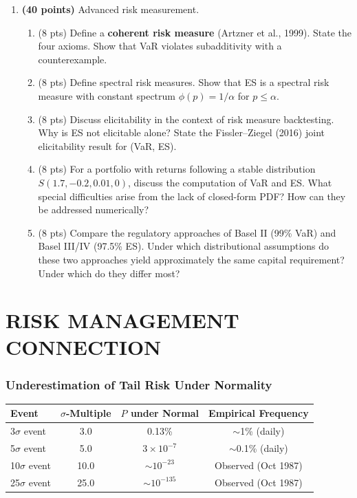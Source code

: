 \documentclass[11pt, a4paper]{article}
\theoremstyle{definition}
\begin{document}
\begin{enumerate}[label=\textbf{PhD-Q\arabic*.}]
\item \textbf{(40 points)} Advanced risk measurement.

\begin{enumerate}[label=(\alph*)]
  \item (8 pts) Define a \textbf{coherent risk measure} (Artzner et al., 1999). State the four axioms. Show that VaR violates subadditivity with a counterexample.
  \item (8 pts) Define spectral risk measures. Show that ES is a spectral risk measure with constant spectrum $\phi(p) = 1/\alpha$ for $p \leq \alpha$.
  \item (8 pts) Discuss elicitability in the context of risk measure backtesting. Why is ES not elicitable alone? State the Fissler--Ziegel (2016) joint elicitability result for (VaR, ES).
  \item (8 pts) For a portfolio with returns following a stable distribution $S(1.7, -0.2, 0.01, 0)$, discuss the computation of VaR and ES. What special difficulties arise from the lack of closed-form PDF? How can they be addressed numerically?
  \item (8 pts) Compare the regulatory approaches of Basel II (99\% VaR) and Basel III/IV (97.5\% ES). Under which distributional assumptions do these two approaches yield approximately the same capital requirement? Under which do they differ most?
\end{enumerate}

\end{enumerate}


\part{RISK MANAGEMENT CONNECTION}

\section{Underestimation of Tail Risk Under Normality}

\begin{center}
\renewcommand{\arraystretch}{1.3}
\begin{tabular}{l c c c}
\toprule
\textbf{Event} & \textbf{$\sigma$-Multiple} & \textbf{$P$ under Normal} & \textbf{Empirical Frequency} \\
\midrule
3$\sigma$ event & 3.0 & 0.13\% & $\sim$1\% (daily) \\
5$\sigma$ event & 5.0 & $3 \times 10^{-7}$ & $\sim$0.1\% (daily) \\
10$\sigma$ event & 10.0 & $\sim 10^{-23}$ & Observed (Oct 1987) \\
25$\sigma$ event & 25.0 & $\sim 10^{-135}$ & Observed (Oct 1987) \\
\bottomrule
\end{tabular}
\end{center}
\end{document}

